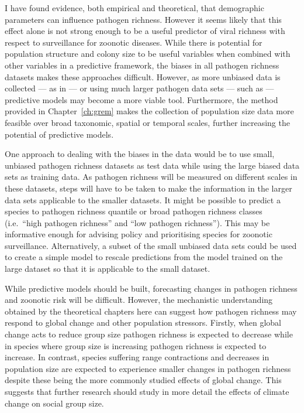 I have found evidence, both empirical and theoretical, that demographic parameters can influence pathogen richness.
However it seems likely that this effect alone is not strong enough to be a useful predictor of viral richness with respect to surveillance for zoonotic diseases.
While there is potential for population structure and colony size to be useful variables when combined with other variables in a predictive framework, the biases in all pathogen richness datasets makes these approaches difficult.
However, as more unbiased data is collected --- as in \textcite{anthony2013strategy, anthony2015non} --- or using much larger pathogen data sets --- such as \textcite{wardeh2015database} --- predictive models may become a more viable tool.
Furthermore, the method provided in Chapter~\ref{ch:grem} makes the collection of population size data more feasible over broad taxonomic, spatial or temporal scales, further increasing the potential of predictive models.

One approach to dealing with the biases in the data would be to use small, unbiased pathogen richness datasets as test data while using the large biased data sets as training data.
As pathogen richness will be measured on different scales in these datasets, steps will have to be taken to make the information in the larger data sets applicable to the smaller datasets.
It might be possible to predict a species to pathogen richness quantile or broad pathogen richness classes (i.e.\ ``high pathogen richness'' and ``low pathogen richness'').
This may be informative enough for advising policy and prioritising species for zoonotic surveillance.
Alternatively, a subset of the small unbiased data sets could be used to create a simple model to rescale predictions from the model trained on the large dataset so that it is applicable to the small dataset.

While predictive models should be built, forecasting changes in pathogen richness and zoonotic risk will be difficult.
However, the mechanistic understanding obtained by the theoretical chapters here can suggest how pathogen richness may respond to global change and other population stressors.
Firstly, when global change acts to reduce group size \cite{lehmann2010apes, zunino2007habitat, manor2003impact, atwood2006influence} pathogen richness is expected to decrease while in species where group size is increasing \cite{lehmann2010apes} pathogen richness is expected to increase.
In contrast, species suffering range contractions \cite{thomas2004extinction} and decreases in population size \cite{craigie2010large} are expected to experience smaller changes in pathogen richness despite these being the more commonly studied effects of global change.
This suggests that further research should study in more detail the effects of climate change on social group size.

